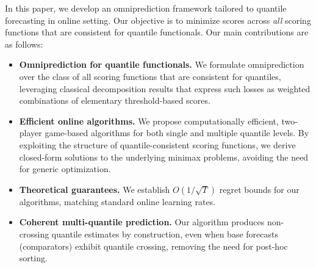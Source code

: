 

In this paper, we develop an omniprediction framework tailored to quantile forecasting in online setting. Our objective is to minimize scores across \emph{all} scoring functions that are consistent for quantile functionals. Our main contributions are as follows:

\begin{itemize}
    \item \textbf{Omniprediction for quantile functionals.} We formulate omniprediction over the class of all scoring functions that are consistent for quantiles, leveraging classical decomposition results that express such losses as weighted combinations of elementary threshold-based scores.
    
    \item \textbf{Efficient online algorithms.} We propose computationally efficient, two-player game-based algorithms for both single and multiple quantile levels. By exploiting the structure of quantile-consistent scoring functions, we derive closed-form solutions to the underlying minimax problems, avoiding the need for generic optimization.
    
    \item \textbf{Theoretical guarantees.} We establish $O(1/\sqrt{T})$ regret bounds for our algorithms, matching standard online learning rates.
    
    \item \textbf{Coherent multi-quantile prediction.} Our algorithm produces non-crossing quantile estimates by construction, even when base forecasts (comparators) exhibit quantile crossing, removing the need for post-hoc sorting.
\end{itemize}


